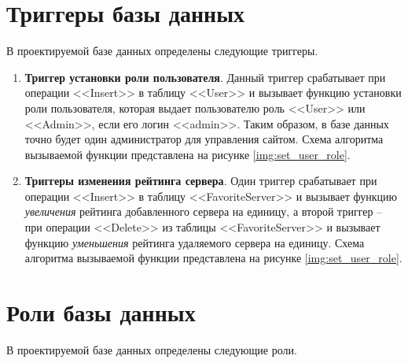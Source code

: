 \clearpage
{}


\section{Триггеры базы данных} \label{triggers} 

В проектируемой базе данных определены следующие триггеры.

\begin{enumerate}
    \item \textbf{Триггер установки роли пользователя}. Данный триггер срабатывает при операции <<Insert>> в таблицу <<User>> и вызывает функцию установки роли пользователя, которая выдает пользователю роль <<User>> или <<Admin>>, если его логин <<admin>>. Таким образом, в базе данных точно будет один администратор для управления сайтом. Схема алгоритма вызываемой функции представлена на рисунке \ref{img:set_user_role}.

    \item \textbf{Триггеры изменения рейтинга сервера}. Один триггер срабатывает при операции <<Insert>> в таблицу <<FavoriteServer>> и вызывает функцию \textit{увеличения} рейтинга добавленного сервера на единицу, а второй триггер -- при операции <<Delete>> из таблицы <<FavoriteServer>> и вызывает функцию \textit{уменьшения} рейтинга удаляемого сервера на единицу. Схема алгоритма вызываемой функции представлена на рисунке \ref{img:set_user_role}.
\end{enumerate}



\section{Роли базы данных} \label{roles}

В проектируемой базе данных определены следующие роли.

